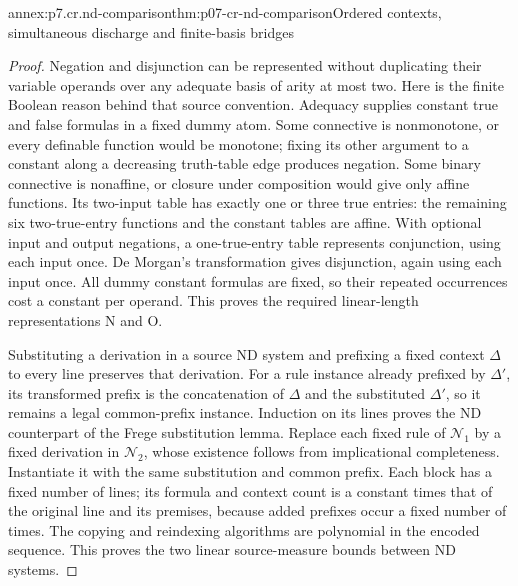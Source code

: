 \begin{annexitem}{annex:p7.cr.nd-comparison}{thm:p07-cr-nd-comparison}{Ordered contexts, simultaneous discharge and finite-basis bridges}
\begin{proof}
Negation and disjunction can be represented without duplicating
their variable operands over any adequate basis of arity at most
two. Here is the finite Boolean reason behind that source convention.
Adequacy supplies constant true and false formulas in a fixed
dummy atom. Some connective is nonmonotone, or every definable
function would be monotone; fixing its other argument to a
constant along a decreasing truth-table edge produces negation.
Some binary connective is nonaffine, or closure under composition
would give only affine functions. Its two-input table has exactly
one or three true entries: the remaining six two-true-entry functions
and the constant tables are affine. With optional input and output
negations, a one-true-entry table represents conjunction, using
each input once. De Morgan's transformation gives disjunction,
again using each input once. All dummy constant formulas are
fixed, so their repeated occurrences cost a constant per operand.
This proves the required linear-length representations N and O.

Substituting a derivation in a source ND system and prefixing a
fixed context \(\Delta\) to every line preserves that derivation.
For a rule instance already prefixed by \(\Delta'\), its transformed
prefix is the concatenation of \(\Delta\) and the substituted
\(\Delta'\), so it remains a legal common-prefix instance.
Induction on its lines proves the ND counterpart of the Frege
substitution lemma. Replace each fixed rule of \(\mathcal N_1\)
by a fixed derivation in \(\mathcal N_2\), whose existence
follows from implicational completeness. Instantiate it with the
same substitution and common prefix. Each block has a fixed number
of lines; its formula and context count is a constant times that
of the original line and its premises, because added prefixes
occur a fixed number of times. The copying and reindexing algorithms
are polynomial in the encoded sequence. This proves the two
linear source-measure bounds between ND systems.


\end{proof}
\end{annexitem}
